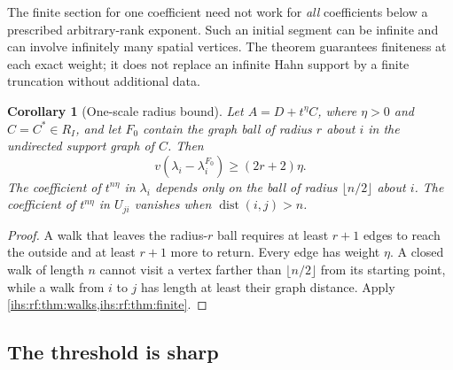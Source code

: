 \documentclass[11pt,a4paper]{article}
\numberwithin{equation}{section}
\newtheorem{corollary}[corollary]{Corollary}
\theoremstyle{definition}
\theoremstyle{remark}
\newcommand{\dist}{\operatorname{dist}}
\begin{document}
The finite section for one coefficient need not work for \emph{all}
coefficients below a prescribed arbitrary-rank exponent. Such an initial
segment can be infinite and can involve infinitely many spatial vertices.
The theorem guarantees finiteness at each exact weight; it does not replace
an infinite Hahn support by a finite truncation without additional data.

\begin{corollary}[One-scale radius bound]\label{ihs:rf:cor:radius}
Let $A=D+t^\eta C$, where $\eta>0$ and $C=C^*\in R_I$, and let $F_0$ contain
the graph ball of radius $r$ about $i$ in the undirected support graph of
$C$. Then
\begin{equation}\label{ihs:rf:eq:radiusbound}
 v(\lambda_i-\lambda_i^{F_0})\ge(2r+2)\eta.
\end{equation}
The coefficient of $t^{n\eta}$ in $\lambda_i$ depends only on the ball of
radius $\lfloor n/2\rfloor$ about $i$. The coefficient of $t^{n\eta}$ in
$U_{ji}$ vanishes when $\dist(i,j)>n$.
\end{corollary}
\begin{proof}
A walk that leaves the radius-$r$ ball requires at least $r+1$ edges to
reach the outside and at least $r+1$ more to return. Every edge has weight
$\eta$. A closed walk of length $n$ cannot visit a vertex farther than
$\lfloor n/2\rfloor$ from its starting point, while a walk from $i$ to $j$
has length at least their graph distance. Apply
\cref{ihs:rf:thm:walks,ihs:rf:thm:finite}.
\end{proof}

\subsection{The threshold is sharp}\label{ihs:rf:sec:sharp}
\end{document}
